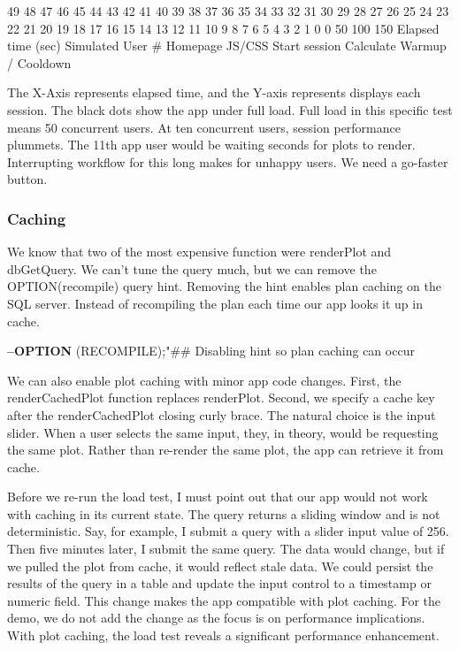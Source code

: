 \documentclass[]{article}
\newenvironment{Shaded}{\begin{snugshade}}{\end{snugshade}}
\newcommand{\ErrorTok}[1]{\textcolor[rgb]{0.64,0.00,0.00}{\textbf{#1}}}
\newcommand{\KeywordTok}[1]{\textcolor[rgb]{0.13,0.29,0.53}{\textbf{#1}}}
\newcommand{\NormalTok}[1]{#1}
\newcommand{\OperatorTok}[1]{\textcolor[rgb]{0.81,0.36,0.00}{\textbf{#1}}}
\newcommand{\StringTok}[1]{\textcolor[rgb]{0.31,0.60,0.02}{#1}}
\begin{document}
49 48 47 46 45 44 43 42 41 40 39 38 37 36 35 34 33 32 31 30 29 28 27 26
25 24 23 22 21 20 19 18 17 16 15 14 13 12 11 10 9 8 7 6 5 4 3 2 1 0 0 50
100 150 Elapsed time (sec) Simulated User \# Homepage JS/CSS Start
session Calculate Warmup / Cooldown

The X-Axis represents elapsed time, and the Y-axis represents displays
each session. The black dots show the app under full load. Full load in
this specific test means 50 concurrent users. At ten concurrent users,
session performance plummets. The 11th app user would be waiting seconds
for plots to render. Interrupting workflow for this long makes for
unhappy users. We need a go-faster button.

\hypertarget{caching}{%
\subsubsection{Caching}\label{caching}}

We know that two of the most expensive function were renderPlot and
dbGetQuery. We can't tune the query much, but we can remove the
OPTION(recompile) query hint. Removing the hint enables plan caching on
the SQL server. Instead of recompiling the plan each time our app looks
it up in cache.

\begin{Shaded}
\begin{Highlighting}[]
\OperatorTok{--}\KeywordTok{OPTION}\NormalTok{ (RECOMPILE);}\StringTok{"## Disabling hint so plan caching can occur}
\end{Highlighting}
\end{Shaded}

We can also enable plot caching with minor app code changes. First, the
renderCachedPlot function replaces renderPlot. Second, we specify a
cache key after the renderCachedPlot closing curly brace. The natural
choice is the input slider. When a user selects the same input, they, in
theory, would be requesting the same plot. Rather than re-render the
same plot, the app can retrieve it from cache.

\begin{Shaded}
\end{Shaded}

Before we re-run the load test, I must point out that our app would not
work with caching in its current state. The query returns a sliding
window and is not deterministic. Say, for example, I submit a query with
a slider input value of 256. Then five minutes later, I submit the same
query. The data would change, but if we pulled the plot from cache, it
would reflect stale data. We could persist the results of the query in a
table and update the input control to a timestamp or numeric field. This
change makes the app compatible with plot caching. For the demo, we do
not add the change as the focus is on performance implications. With
plot caching, the load test reveals a significant performance
enhancement.
\end{document}
